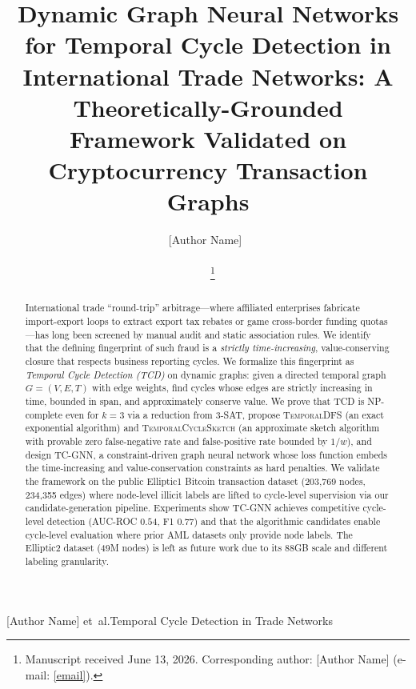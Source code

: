 \documentclass[journal,onecolumn]{IEEEtran}
\begin{document}
\title{Dynamic Graph Neural Networks for Temporal Cycle Detection in\\
       International Trade Networks: A Theoretically-Grounded\\
       Framework Validated on Cryptocurrency Transaction Graphs}

\author{[Author Name]~\IEEEmembership{[Affiliation],}\\
        [Co-Author Name]~\IEEEmembership{[Affiliation],}\\
        [Co-Author Name]~\IEEEmembership{[Affiliation]}
\thanks{Manuscript received June 13, 2026. Corresponding author: [Author Name] (e-mail: \url{[email]}).}}
%
{[Author Name] et~al.\:Temporal Cycle Detection in Trade Networks}

\usepackage{graphicx}
\graphicspath{{figures/}}

\begin{abstract}
International trade ``round-trip'' arbitrage---where affiliated enterprises
fabricate import-export loops to extract export tax rebates or game
cross-border funding quotas---has long been screened by manual audit and
static association rules. We identify that the defining fingerprint of such
fraud is a \emph{strictly time-increasing}, value-conserving closure that
respects business reporting cycles. We formalize this fingerprint as
\emph{Temporal Cycle Detection (TCD)} on dynamic graphs: given a directed
temporal graph $G=(V,E,T)$ with edge weights, find cycles whose edges are
strictly increasing in time, bounded in span, and approximately conserve
value. We prove that TCD is NP-complete even for $k=3$ via a reduction from
3-SAT, propose \textsc{TemporalDFS} (an exact exponential algorithm) and
\textsc{TemporalCycleSketch} (an approximate sketch algorithm with provable
zero false-negative rate and false-positive rate bounded by $1/w$), and
design \textsc{TC-GNN}, a constraint-driven graph neural network whose
loss function embeds the time-increasing and value-conservation constraints
as hard penalties. We validate the framework on the public Elliptic1
Bitcoin transaction dataset (203{,}769 nodes, 234{,}355 edges) where
node-level illicit labels are lifted to cycle-level supervision via our
candidate-generation pipeline. Experiments show TC-GNN achieves competitive
cycle-level detection (AUC-ROC $0.54$, F1 $0.77$) and that the algorithmic
candidates enable cycle-level evaluation where prior AML datasets only
provide node labels. The Elliptic2 dataset (49M nodes) is left as future
work due to its $88$GB scale and different labeling granularity.
\end{abstract}
\end{document}
